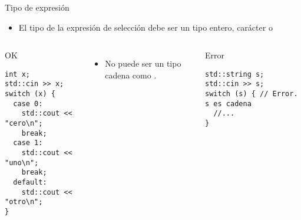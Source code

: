 \begin{frame}[t,fragile]{Tipo de expresión}
\begin{itemize}
  \item El tipo de la expresión de selección debe ser un tipo entero,
        carácter o 
\end{itemize}

\begin{columns}[T]

\begin{block}{OK}
\begin{lstlisting}
int x;
std::cin >> x;
switch (x) {
  case 0:
    std::cout << "cero\n";
    break;
  case 1:
    std::cout << "uno\n";
    break;
  default:
    std::cout << "otro\n";
}
\end{lstlisting}
\end{block}

\begin{itemize}
  \item No puede ser un tipo cadena como .
\end{itemize}
\begin{block}{Error}
\begin{lstlisting}
std::string s;
std::cin >> s;
switch (s) { // Error. s es cadena
  //...
}
\end{lstlisting}
\end{block}
\end{columns}
\end{frame}

